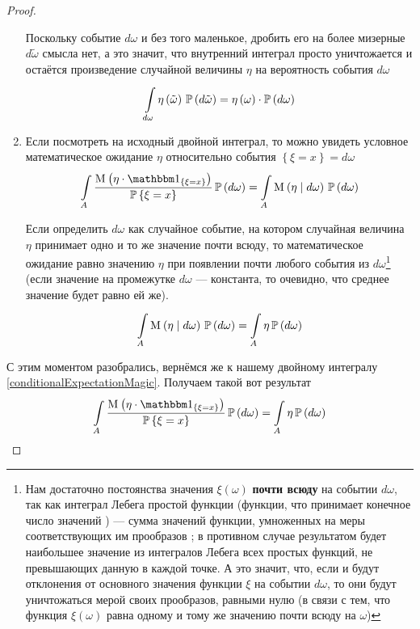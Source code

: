 \begin{proof}
\begin{enumerate}[label=\bfseries Формулировка \arabic*:]
        Поскольку событие $d\omega$ и без того маленькое,
        дробить его на более мизерные $d\tilde{\omega}$ смысла нет,
        а это значит, что внутренний интеграл просто уничтожается
        и остаётся произведение случайной величины $\eta$
        на вероятность события $d\omega$
        $$\integrall{d\omega}{\probability{d\tilde{\omega}}}{
            \eta\left( \tilde{\omega} \right)}
            = \eta\left( \omega \right) \cdot \probability{d\omega}$$
    \item
        Если посмотреть на исходный двойной интеграл,
        то можно увидеть условное математическое ожидание $\eta$
        относительно события $\left\{ \xi = x \right\}=d\omega$
        $$\integrall{A}{\probability{d\omega}}{
            \frac{\mean{\left( \eta
                \cdot \indicatorof{\left\{ \xi = x \right\}} \right)}}
                    {\Probability{\xi = x}}}
            = \integrall{A}{\probability{d\omega}}{\mean{
                \left( \eta \mid d\omega \right)}}$$

        Если определить $d\omega$ как случайное событие,
        на котором случайная величина $\eta$ принимает
        одно и то же значение почти всюду,
        то математическое ожидание равно значению $\eta$
        при появлении почти любого события из $d\omega$\footnote{Нам достаточно
        постоянства значения $\xi\left( \omega \right)$ \textbf{почти всюду}
        на событии $d\omega$,
        так как интеграл Лебега простой функции (функции,
        что принимает конечное число значений \cite[стр.~53]{DorogovtsevIT})
        --- сумма значений функции, умноженных на меры
        соответствующих им прообразов \cite[стр.~69]{DorogovtsevIT};
        в противном случае результатом будет наибольшее значение
        из интегралов Лебега всех простых функций,
        не превышающих данную в каждой точке.
        А это значит, что, если и будут отклонения от основного значения функции
        $\xi$ на событии $d\omega$,
        то они будут уничтожаться мерой своих прообразов, равными нулю
        (в связи с тем, что функция $\xi\left( \omega \right)$
        равна одному и тому же значению почти всюду на $\omega$)
        }
        (если значение на промежутке $d\omega$ --- константа,
        то очевидно, что среднее значение будет равно ей же).
        $$\integrall{A}{\probability{d\omega}}{\mean{
            \left( \eta \mid d\omega \right)}}
            = \integrall{A}{\probability{d\omega}}{\eta}$$
\end{enumerate}

С этим моментом разобрались, вернёмся же к нашему двойному интегралу
\eqref{conditionalExpectationMagic}.
Получаем такой вот результат
$$\integrall{A}{\probability{d\omega}}{
    \frac{\mean{\left( \eta
        \cdot \indicatorof{\left\{ \xi = x \right\}} \right)}}
        {\Probability{\xi = x}}}
    = \integrall{A}{\probability{d\omega}}{\eta}$$


\end{proof}
